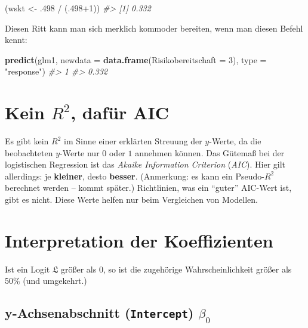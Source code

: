 \documentclass[12pt,ngerman,]{book}
\makeatletter
\newenvironment{Shaded}{\begin{snugshade}}{\end{snugshade}}
\newcommand{\KeywordTok}[1]{\textcolor[rgb]{0.13,0.29,0.53}{\textbf{{#1}}}}
\newcommand{\DataTypeTok}[1]{\textcolor[rgb]{0.13,0.29,0.53}{{#1}}}
\newcommand{\DecValTok}[1]{\textcolor[rgb]{0.00,0.00,0.81}{{#1}}}
\newcommand{\StringTok}[1]{\textcolor[rgb]{0.31,0.60,0.02}{{#1}}}
\newcommand{\CommentTok}[1]{\textcolor[rgb]{0.56,0.35,0.01}{\textit{{#1}}}}
\newcommand{\NormalTok}[1]{{#1}}
\newenvironment{kframe}{%
\medskip{}
\setlength{\fboxsep}{.8em}
 \def\at@end@of@kframe{}%
 \ifinner\ifhmode%
  \def\at@end@of@kframe{\end{minipage}}%
  \begin{minipage}{\columnwidth}%
 \fi\fi%
 \def\FrameCommand##1{\hskip\@totalleftmargin \hskip-\fboxsep
 \colorbox{shadecolor}{##1}\hskip-\fboxsep
     \hskip-\linewidth \hskip-\@totalleftmargin \hskip\columnwidth}%
 \MakeFramed {\advance\hsize-\width
   \@totalleftmargin\z@ \linewidth\hsize
   \@setminipage}}%
 {\par\unskip\endMakeFramed%
 \at@end@of@kframe}
\renewenvironment{Shaded}{\begin{kframe}}{\end{kframe}}
\theoremstyle{definition}
\theoremstyle{definition}
\theoremstyle{remark}
\makeatother
\begin{document}
\begin{Shaded}
\begin{Highlighting}[]
\NormalTok{(wskt <-}\StringTok{ }\NormalTok{.}\DecValTok{498} \NormalTok{/}\StringTok{ }\NormalTok{(.}\DecValTok{498+1}\NormalTok{))}
\CommentTok{#> [1] 0.332}
\end{Highlighting}
\end{Shaded}

Diesen Ritt kann man sich merklich kommoder bereiten, wenn man diesen
Befehl kennt:

\begin{Shaded}
\begin{Highlighting}[]
\KeywordTok{predict}\NormalTok{(glm1, }\DataTypeTok{newdata =} \KeywordTok{data.frame}\NormalTok{(}\DataTypeTok{Risikobereitschaft =} \DecValTok{3}\NormalTok{), }\DataTypeTok{type =} \StringTok{"response"}\NormalTok{)}
\CommentTok{#>     1 }
\CommentTok{#> 0.332}
\end{Highlighting}
\end{Shaded}

\section{\texorpdfstring{Kein \(R^2\), dafür
AIC}{Kein R\^{}2, dafür AIC}}\label{kein-r2-dafur-aic}

Es gibt kein \(R^2\) im Sinne einer erklärten Streuung der \(y\)-Werte,
da die beobachteten \(y\)-Werte nur \(0\) oder \(1\) annehmen können.
Das Gütemaß bei der logistischen Regression ist das \emph{Akaike
Information Criterion} (\emph{AIC}). Hier gilt allerdings: je
\textbf{kleiner}, desto \textbf{besser}. (Anmerkung: es kann ein
Pseudo-\(R^2\) berechnet werden -- kommt später.) Richtlinien, was ein
``guter'' AIC-Wert ist, gibt es nicht. Diese Werte helfen nur beim
Vergleichen von Modellen.

\section{Interpretation der
Koeffizienten}\label{interpretation-der-koeffizienten}

Ist ein Logit \(\mathfrak{L}\) größer als \(0\), so ist die zugehörige
Wahrscheinlichkeit größer als 50\% (und umgekehrt.)

\subsection{\texorpdfstring{y-Achsenabschnitt (\texttt{Intercept})
\(\beta_0\)}{y-Achsenabschnitt (Intercept) \textbackslash{}beta\_0}}\label{y-achsenabschnitt-intercept-beta_0}
\end{document}
